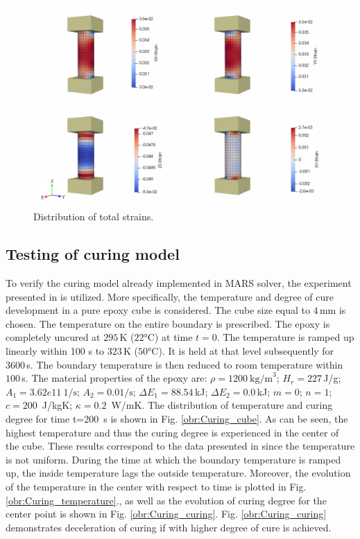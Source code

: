 \begin{figure}[h!]
	\centering
	\includegraphics[width=1.05\textwidth]{obrazky/compression_zpevneni_strain.png}
	\caption[Distribution of total strains]{Distribution of total strains.}\label{obr:Compresion_total_strain}
\end{figure}






\clearpage
\subsection{Testing of curing model}
\indent

To verify the curing model already implemented in MARS solver, the experiment presented in \cite{heinrich2012generation} is utilized. More specifically, the temperature and degree of cure development in a pure epoxy cube is considered. The cube size equal to $4$\,mm is chosen. The temperature on the entire boundary is prescribed. The epoxy is completely uncured at $295$\,K ($22$°C) at time $t = 0$. The temperature is ramped up linearly within 100 s to $323$\,K ($50$°C). It is held at that level subsequently for $3600$\,s. The boundary temperature is then reduced to room temperature within $100$\,s. The material properties of the epoxy are:  $\rho=1200~\mathrm{kg/m}^3$;  $H_r=227$\,J/g; $A_1=3.62e11~\mathrm{1/s}$; $A_2=0.0\mathrm{1/s}$; $\Delta E_1=88.54$\,kJ; $\Delta E_2=0.0$\,kJ; $m=0$; $n=1$; $c=200$~J/kgK; $\kappa=0.2$ \,W/mK. The distribution of temperature and curing degree for time t=200~s is shown in Fig. \ref{obr:Curing_cube}. As can be seen, the highest temperature and thus the curing degree is experienced in the center of the cube. These results correspond to the data presented in \cite{heinrich2012generation} since the temperature is not uniform. During the time at which the boundary temperature is ramped up, the inside temperature lags the outside temperature. Moreover, the evolution of the temperature in the center with respect to time is plotted in Fig. \ref{obr:Curing_temperature}., as well as the evolution of curing degree for the center point is shown in Fig. \ref{obr:Curing_curing}. Fig. \ref{obr:Curing_curing} demonstrates deceleration of curing if with higher degree of cure is achieved.



